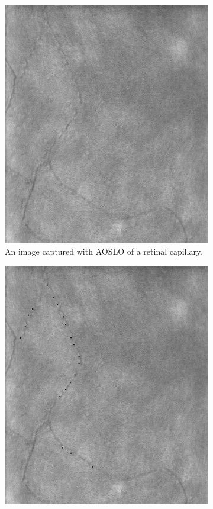 \documentclass[]{article}
\begin{document}
\begin{figure}
	\centering
	\begin{subfigure}[t]{0.45\textwidth}
		\centering
		\includegraphics[scale=0.3]{Subject3_Session216_OD_(0,0)_1x1_980_OA790nm_dewarped_first.jpg}
		\caption{An image captured with AOSLO of a retinal capillary.}
		\label{fig:eye-capillary}
	\end{subfigure}
	\hfill
	\centering
	\begin{subfigure}[t]{0.45\textwidth}
		\centering
		\includegraphics[scale=0.3]{Subject3_Session216_OD_(0,0)_1x1_980_OA790nm_marked_first.jpg}

\end{subfigure}
\end{figure}
\end{document}
